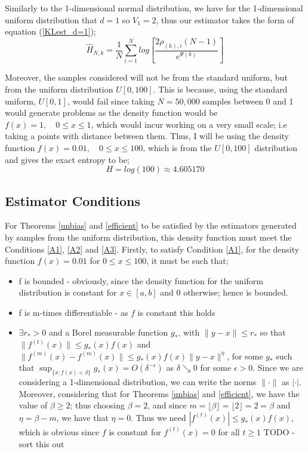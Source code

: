 \documentclass{report}
\begin{document}
Similarly to the 1-dimensional normal distribution, we have for the 1-dimensional uniform distribution that $d=1$ so $V_{1} = 2$, thus our estimator takes the form of equation (\ref{KLest_d=1});
\begin{equation}
\hat{H}_{N, k} =  \frac{1}{N} \sum_{i=1}^{N} log \left[ \frac{2\rho_{(k),i}(N-1)}{e^{\Psi(k)}} \right]\nonumber
\end{equation}

Moreover, the samples considered will not be from the standard uniform, but from the uniform distribution $U[0,100]$. This is because, using the standard uniform, $U[0,1]$, would fail since taking $N=50,000$ samples between 0 and 1 would generate problems as the density function would be $f(x) = 1 , \quad 0 \leq x \leq 1$, which would incur working on a very small scale; i.e taking a points with distance between them. Thus, I will be using the density function $f(x) = 0.01 , \quad 0 \leq x \leq 100$, which is from the $U[0,100]$ distribution and gives the exact entropy to be;
\begin{equation} \label{uniform_exact}
H = log(100) \approx 4.605170
\end{equation}




\subsection{Estimator Conditions} \label{U_Conditions}

For Theorems \ref{unbias} and \ref{efficient} to be satisfied by the estimators generated by samples from the uniform distribution, this density function must meet the Conditions \ref{A1}, \ref{A2} and \ref{A3}. 
Firstly, to satisfy Condition \ref{A1}, for the density function $f(x) = 0.01$ for $0 \leq x \leq 100$, it must be such that;
\begin{itemize}
\item f is bounded - obviously, since the density function for the uniform distribution is constant for $x \in [a, b]$ and $0$ otherwise; hence is bounded.

\item f is m-times differentiable - as $f$ is constant this holds

\item $\exists r_{*} > 0$ and a Borel measurable function $g_{*}$, with $\|y-x\| \leq r_{*}$ so that $\|f^{(t)}(x)\| \leq g_{*}(x) f(x)$ and $\|f^{(m)}(x) - f^{(m)}(x)\| \leq g_{*}(x) f(x)\|y - x\|^{\eta}$, for some $g_{*}$ such that $\sup_{\{x : f(x) < \delta\}} g_{*}(x) = O(\delta^{-\epsilon})$ as $\delta \searrow 0$ for some $\epsilon >0$.
Since we are considering a 1-dimensional distribution, we can write the norms $\| \cdotp \|$ as  $| \cdotp |$. Moreover, considering that for Theorems \ref{unbias} and \ref{efficient}, we have the value of $\beta \geq 2$; thus choosing $\beta = 2$, and since $m = \lfloor \beta \rfloor =  \lfloor 2 \rfloor = 2 = \beta$ and $\eta = \beta -m$, we have that $\eta =0$. Thus we need  $|f^{(t)}(x)| \leq g_{*}(x) f(x)$, which is obvious since $f$ is constant for $f^{(t)}(x) = 0$ for all $t \geq 1$ TODO - sort this out

\end{itemize}
\end{document}
